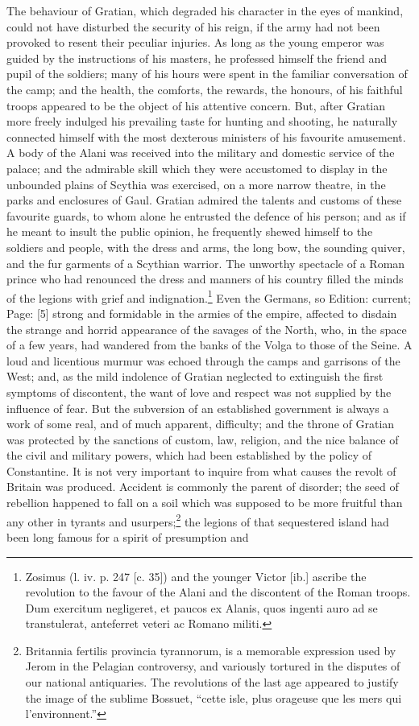 The behaviour of Gratian, which degraded his character in the eyes of mankind, could not have disturbed the security of his reign, if the army had not been provoked to resent their peculiar injuries. As long as the young emperor was guided by the instructions of his masters, he professed himself the friend and pupil of the soldiers; many of his hours were spent in the familiar conversation of the camp; and the health, the comforts, the rewards, the honours, of his faithful troops appeared to be the object of his attentive concern. But, after Gratian more freely indulged his prevailing taste for hunting and shooting, he naturally connected himself with the most dexterous ministers of his favourite amusement. A body of the Alani was received into the military and domestic service of the palace; and the admirable skill which they were accustomed to display in the unbounded plains of Scythia was exercised, on a more narrow theatre, in the parks and enclosures of Gaul. Gratian admired the talents and customs of these favourite guards, to whom alone he entrusted the defence of his person; and as if he meant to insult the public opinion, he frequently shewed himself to the soldiers and people, with the dress and arms, the long bow, the sounding quiver, and the fur garments of a Scythian warrior. The unworthy spectacle of a Roman prince who had renounced the dress and manners of his country filled the minds of the legions with grief and indignation.\footnote{Zosimus (l. iv. p. 247 [c. 35]) and the younger Victor [ib.] ascribe the revolution to the favour of the Alani and the discontent of the Roman troops. Dum exercitum negligeret, et paucos ex Alanis, quos ingenti auro ad se transtulerat, anteferret veteri ac Romano militi.} Even the Germans, so Edition: current; Page: [5] strong and formidable in the armies of the empire, affected to disdain the strange and horrid appearance of the savages of the North, who, in the space of a few years, had wandered from the banks of the Volga to those of the Seine. A loud and licentious murmur was echoed through the camps and garrisons of the West; and, as the mild indolence of Gratian neglected to extinguish the first symptoms of discontent, the want of love and respect was not supplied by the influence of fear. But the subversion of an established government is always a work of some real, and of much apparent, difficulty; and the throne of Gratian was protected by the sanctions of custom, law, religion, and the nice balance of the civil and military powers, which had been established by the policy of Constantine. It is not very important to inquire from what causes the revolt of Britain was produced. Accident is commonly the parent of disorder; the seed of rebellion happened to fall on a soil which was supposed to be more fruitful than any other in tyrants and usurpers;\footnote{Britannia fertilis provincia tyrannorum, is a memorable expression used by Jerom in the Pelagian controversy, and variously tortured in the disputes of our national antiquaries. The revolutions of the last age appeared to justify the image of the sublime Bossuet, \texthebrew{“}cette isle, plus orageuse que les mers qui l\texthebrew{}’environnent.\texthebrew{}”} the legions of that sequestered island had been long famous for a spirit of presumption and 